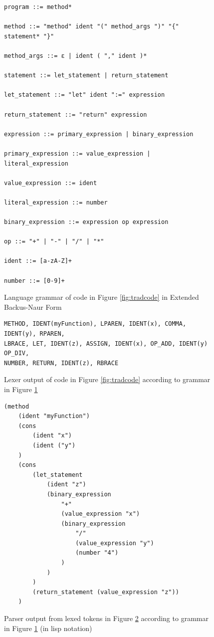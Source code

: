 \begin{figure}[H]
\centering
\begin{verbatim}
program ::= method*

method ::= "method" ident "(" method_args ")" "{" statement* "}"

method_args ::= ε | ident ( "," ident )*

statement ::= let_statement | return_statement

let_statement ::= "let" ident ":=" expression

return_statement ::= "return" expression

expression ::= primary_expression | binary_expression

primary_expression ::= value_expression | literal_expression

value_expression ::= ident

literal_expression ::= number

binary_expression ::= expression op expression

op ::= "+" | "-" | "/" | "*"

ident ::= [a-zA-Z]+

number ::= [0-9]+
\end{verbatim}
\caption{Language grammar of code in Figure \ref{fig:tradcode} in Extended Backus-Naur Form}
\label{fig:tradgrammar} %
\end{figure}

\begin{figure}[H]
\centering
\begin{verbatim}
METHOD, IDENT(myFunction), LPAREN, IDENT(x), COMMA, IDENT(y), RPAREN,
LBRACE, LET, IDENT(z), ASSIGN, IDENT(x), OP_ADD, IDENT(y) OP_DIV,
NUMBER, RETURN, IDENT(z), RBRACE
\end{verbatim}
\caption{Lexer output of code in Figure \ref{fig:tradcode} according to grammar in Figure \ref{fig:tradgrammar}}
\label{fig:tradlexed} %
\end{figure}

\begin{figure}[H]
\centering
\begin{verbatim}
(method
    (ident "myFunction")
    (cons
        (ident "x")
        (ident ("y")
    )
    (cons
        (let_statement
            (ident "z")
            (binary_expression
                "+"
                (value_expression "x")
                (binary_expression
                    "/"
                    (value_expression "y")
                    (number "4") 
                )
            )
        )
        (return_statement (value_expression "z"))
    )
\end{verbatim}
\caption{Parser output from lexed tokens in Figure \ref{fig:tradlexed} according to grammar in Figure \ref{fig:tradgrammar} (in lisp notation)}
\label{fig:tradparsed} %
\end{figure}

